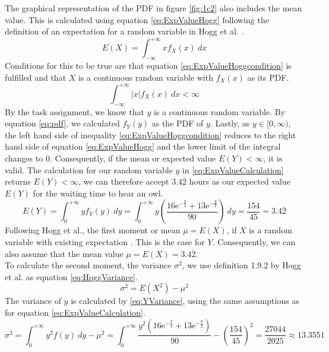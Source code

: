 The graphical representation of the PDF in figure \eqref{fig:1c2} also includes the mean value. This is calculated using equation \eqref{eq:ExpValueHogg} following the definition of an expectation for a random variable in Hogg et al. \cite[Definition~1.8.1]{hogg}.
\begin{equation}
E(X) = \int^{+\infty}_{-\infty} x f_X(x) ~ dx
\label{eq:ExpValueHogg}
\end{equation}
Conditions for this to be true are that equation \eqref{eq:ExpValueHoggcondition} is fulfilled and that $X$ is a continuous random variable with $f_X(x)$ as its PDF.
\begin{equation}
\int^{+\infty}_{-\infty} |x| f_X(x) ~ dx < \infty
\label{eq:ExpValueHoggcondition}
\end{equation}
By the task assignment, we know that $y$ is a continuous random variable. By equation \eqref{eq:pdf}, we calculated $f_Y(y)$ as the PDF of $y$. Lastly, as $y \in [0,\infty)$, the left hand side of inequality \eqref{eq:ExpValueHoggcondition} reduces to the right hand side of equation \eqref{eq:ExpValueHogg} and the lower limit of the integral changes to 0. Consequently, if the mean or expected value $E(Y) < \infty$, it is valid. The calculation for our random variable $y$ in \eqref{eq:ExpValueCalculation} returns $E(Y) < \infty$, we can therefore accept $3.4\overline{2}$ hours as our expected value $E(Y)$ for the waiting time to hear an owl. 
%
\begin{equation}
E(Y) = \int^{+\infty}_{0} y f_Y(y) ~ dy = \int^{+\infty}_{0} y\left(\dfrac{16\mathrm{e}^{-\frac{y}{4}}+13\mathrm{e}^{-\frac{y}{2}}}{90} \right) ~dy = \frac{154}{45} = 3.4\overline{2}
\label{eq:ExpValueCalculation}
\end{equation}
Following Hogg et al., the first moment or mean $\mu = E(X)$, if $X$ is a random variable with existing expectation \cite[Definition~1.9.1]{hogg}. This is the case for $Y$. Consequently, we can also assume that the mean value $\mu = E(X) = 3.4\overline{2}$. 
\\

To calculate the second moment, the variance $\sigma^2$, we use definition 1.9.2 by Hogg et al. \cite{hogg} as equation \eqref{eq:HoggVariance}.
\begin{equation}
\sigma^2 = E(X^2) - \mu^2
\label{eq:HoggVariance}
\end{equation}
%
The variance of $y$ is calculated by \eqref{eq:YVariance}, using the same assumptions as for equation \eqref{eq:ExpValueCalculation}.
\begin{equation}
\sigma^2 = \int^{+\infty}_{0} y^2 f(y) ~ dy - \mu^2
= \int^{+\infty}_{0} \dfrac{y^2\left(16\mathrm{e}^{-\frac{y}{4}}+13\mathrm{e}^{-\frac{y}{2}}\right)}{90} - \left(\frac{154}{45}\right)^2
= \frac{27044}{2025} \approx 13.3551
\label{eq:YVariance}
\end{equation}

